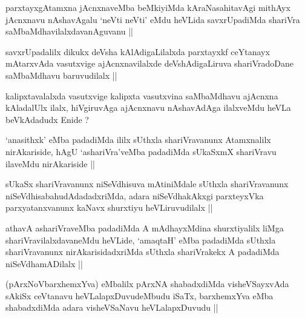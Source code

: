 \begin{artha}
parxtayxgAtamxna jAcnxnaveMba beMkiyiMda kAraNasahitavAgi mithAyx
jAcnxnavu nAshavAgalu `neVti neVti' eMdu heVLida savxrUpadiMda
shariVra saMbaMdhavilalxdavanAguvanu ||
\end{artha}

\begin{artha}
savxrUpadalilx dikukx deVsha kAlAdigaLilalxda parxtayxkf ceYtanayx
mAtarxvAda vasutxvige ajAcnxnavilalxde deVshAdigaLiruva shariVradoDane
saMbaMdhavu baruvudilalx ||
\end{artha}

\begin{artha}
kalipxtavalalxda vasutxvige kalipxta vasutxvina saMbaMdhavu ajAcnxna
kAladalUlx ilalx, hiVgiruvAga ajAcnxnavu nAshavAdAga ilalxveMdu heVLa
beVkAdadudx Enide ?
\end{artha}


\begin{artha}
`anasithxk' eMba padadiMda ililx sUthxla shariVravanunx Atamxnalilx
  nirAkariside, hAgU `ashariVra'veMba padadiMda sUkaSxmX shariVravu
  ilaveMdu nirAkariside ||
\end{artha}


\begin{artha}
sUkaSx shariVravanunx niSeVdhisuva mAtiniMdale sUthxla shariVravanunx
niSeVdhisabahudAdadadxriMda, adara niSeVdhakAkxgi parxteyxVka
parxyatanxvanunx kaNavx shurxtiyu heVLiruvudilalx ||
\end{artha}

\begin{artha}
athavA ashariVraveMba padadiMda A mAdhayxMdina shurxtiyalilx liMga
shariVravilalxdavaneMdu heVLide, `amaqtaH' eMba padadiMda sUthxla
shariVravanunx nirAkarisidadxriMda sUthxla shariVrakekx A padadiMda
niSeVdhamADilalx ||
\end{artha}

\begin{artha}
(pArxNoVbarxhemxYva) eMbalilx pArxNA shabadxdiMda visheVSayxvAda
  sAkiSx ceVtanavu heVLalapxDuvudeMbudu iSaTx, barxhemxYva eMba
  shabadxdiMda adara visheVSaNavu heVLalapxDuvudu ||
\end{artha}


